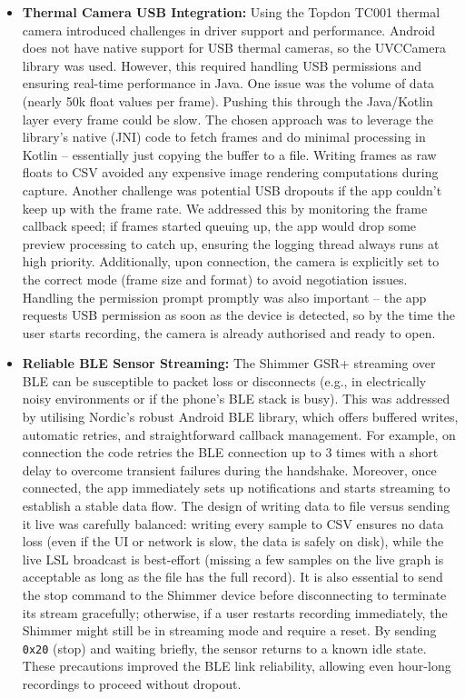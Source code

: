 \begin{itemize}
	\item \textbf{Thermal Camera USB Integration:} Using the Topdon TC001 thermal camera introduced challenges in driver support and performance. Android does not have native support for USB thermal cameras, so the UVCCamera library was used. However, this required handling USB permissions and ensuring real-time performance in Java. One issue was the volume of data (nearly 50k float values per frame). Pushing this through the Java/Kotlin layer every frame could be slow. The chosen approach was to leverage the library's native (JNI) code to fetch frames and do minimal processing in Kotlin -- essentially just copying the buffer to a file. Writing frames as raw floats to CSV avoided any expensive image rendering computations during capture. Another challenge was potential USB dropouts if the app couldn't keep up with the frame rate. We addressed this by monitoring the frame callback speed; if frames started queuing up, the app would drop some preview processing to catch up, ensuring the logging thread always runs at high priority. Additionally, upon connection, the camera is explicitly set to the correct mode (frame size and format) to avoid negotiation issues. Handling the permission prompt promptly was also important -- the app requests USB permission as soon as the device is detected, so by the time the user starts recording, the camera is already authorised and ready to open.
	\item \textbf{Reliable BLE Sensor Streaming:} The Shimmer GSR+ streaming over BLE can be susceptible to packet loss or disconnects (e.g., in electrically noisy environments or if the phone's BLE stack is busy). This was addressed by utilising Nordic's robust Android BLE library, which offers buffered writes, automatic retries, and straightforward callback management. For example, on connection the code retries the BLE connection up to 3 times with a short delay to overcome transient failures during the handshake. Moreover, once connected, the app immediately sets up notifications and starts streaming to establish a stable data flow. The design of writing data to file versus sending it live was carefully balanced: writing every sample to CSV ensures no data loss (even if the UI or network is slow, the data is safely on disk), while the live LSL broadcast is best-effort (missing a few samples on the live graph is acceptable as long as the file has the full record). It is also essential to send the stop command to the Shimmer device before disconnecting to terminate its stream gracefully; otherwise, if a user restarts recording immediately, the Shimmer might still be in streaming mode and require a reset. By sending \texttt{0x20} (stop) and waiting briefly, the sensor returns to a known idle state. These precautions improved the BLE link reliability, allowing even hour-long recordings to proceed without dropout.

\end{itemize}
